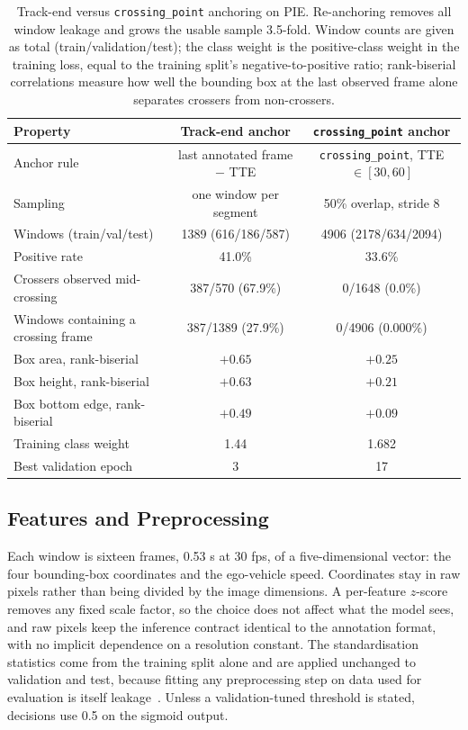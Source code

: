 \documentclass[mti,article,submit,moreauthors]{Definitions/mdpi}
\begin{document}
\begin{table}[H]
\caption{Track-end versus \texttt{crossing\_point} anchoring on PIE. Re-anchoring removes all window leakage and grows the usable sample 3.5-fold. Window counts are given as total (train/validation/test); the class weight is the positive-class weight in the training loss, equal to the training split's negative-to-positive ratio; rank-biserial correlations measure how well the bounding box at the last observed frame alone separates crossers from non-crossers.\label{tab:protocol}}
\begin{tabularx}{\textwidth}{lCC}
\toprule
\textbf{Property} & \textbf{Track-end anchor} & \textbf{\texttt{crossing\_point} anchor}\\
\midrule
Anchor rule & last annotated frame $-$ TTE & \texttt{crossing\_point}, TTE $\in [30,60]$\\
Sampling & one window per segment & 50\% overlap, stride 8\\
Windows (train/val/test) & 1389 (616/186/587) & 4906 (2178/634/2094)\\
Positive rate & 41.0\% & 33.6\%\\
Crossers observed mid-crossing & 387/570 (67.9\%) & 0/1648 (0.0\%)\\
Windows containing a crossing frame & 387/1389 (27.9\%) & 0/4906 (0.000\%)\\
Box area, rank-biserial & $+0.65$ & $+0.25$\\
Box height, rank-biserial & $+0.63$ & $+0.21$\\
Box bottom edge, rank-biserial & $+0.49$ & $+0.09$\\
Training class weight & 1.44 & 1.682\\
Best validation epoch & 3 & 17\\
\bottomrule
\end{tabularx}
\end{table}

\subsection{Features and Preprocessing}

Each window is sixteen frames, 0.53 s at 30 fps, of a five-dimensional vector: the four bounding-box coordinates and the ego-vehicle speed. Coordinates stay in raw pixels rather than being divided by the image dimensions. A per-feature $z$-score removes any fixed scale factor, so the choice does not affect what the model sees, and raw pixels keep the inference contract identical to the annotation format, with no implicit dependence on a resolution constant. The standardisation statistics come from the training split alone and are applied unchanged to validation and test, because fitting any preprocessing step on data used for evaluation is itself leakage~\citep{kaufman2012leakage}. Unless a validation-tuned threshold is stated, decisions use 0.5 on the sigmoid output.
\end{document}
